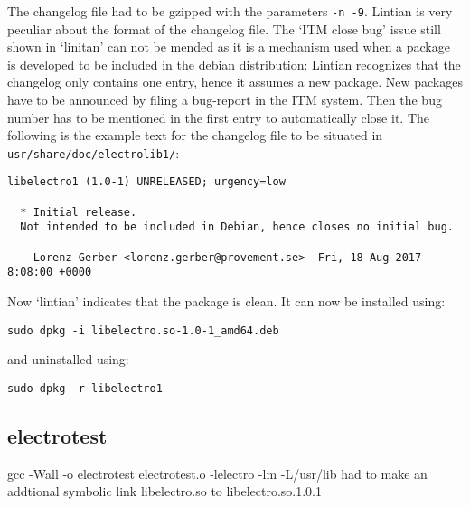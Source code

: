 \documentclass[a4paper,11pt,twoside]{article}
\begin{document}
The changelog file had to be gzipped with the parameters \verb+-n -9+. Lintian
is very peculiar about the format of the changelog file. The `ITM close bug'
issue still shown in `linitan'  can not be mended as it is a mechanism used
when a package is developed to be included in the debian distribution: Lintian
recognizes that the changelog only contains one entry, hence it assumes a new
package. New packages have to be announced by filing a bug-report in the ITM
system. Then the bug number has to be mentioned in the first entry to automatically
close it. The following is the example text for the changelog file to be situated
in \verb+usr/share/doc/electrolib1/+:
\begin{verbatim}
libelectro1 (1.0-1) UNRELEASED; urgency=low

  * Initial release.
  Not intended to be included in Debian, hence closes no initial bug.

 -- Lorenz Gerber <lorenz.gerber@provement.se>  Fri, 18 Aug 2017 8:08:00 +0000
\end{verbatim}
Now `lintian' indicates that the package is clean. It can now be installed using:
\begin{verbatim}
sudo dpkg -i libelectro.so-1.0-1_amd64.deb
\end{verbatim}
and uninstalled using:
\begin{verbatim}
sudo dpkg -r libelectro1
\end{verbatim}

\subsection{electrotest}
gcc -Wall -o electrotest electrotest.o -lelectro -lm -L/usr/lib
had to make an addtional symbolic link libelectro.so to libelectro.so.1.0.1




\end{document}
